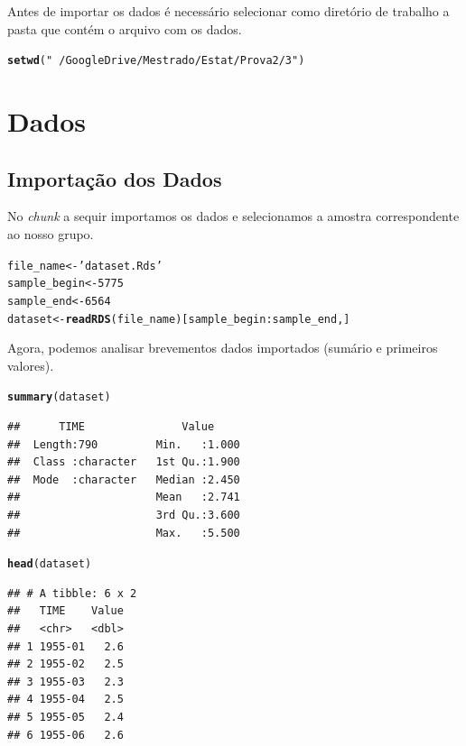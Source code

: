\documentclass{article}\usepackage[]{graphicx}\usepackage[]{color}
\makeatletter
\newcommand{\hlnum}[1]{\textcolor[rgb]{0.686,0.059,0.569}{#1}}%
\newcommand{\hlstr}[1]{\textcolor[rgb]{0.192,0.494,0.8}{#1}}%
\newcommand{\hlopt}[1]{\textcolor[rgb]{0,0,0}{#1}}%
\newcommand{\hlstd}[1]{\textcolor[rgb]{0.345,0.345,0.345}{#1}}%
\newcommand{\hlkwb}[1]{\textcolor[rgb]{0.69,0.353,0.396}{#1}}%
\newcommand{\hlkwd}[1]{\textcolor[rgb]{0.737,0.353,0.396}{\textbf{#1}}}%
\newenvironment{kframe}{%
 \def\at@end@of@kframe{}%
 \ifinner\ifhmode%
  \def\at@end@of@kframe{\end{minipage}}%
  \begin{minipage}{\columnwidth}%
 \fi\fi%
 \def\FrameCommand##1{\hskip\@totalleftmargin \hskip-\fboxsep
 \colorbox{shadecolor}{##1}\hskip-\fboxsep
     \hskip-\linewidth \hskip-\@totalleftmargin \hskip\columnwidth}%
 \MakeFramed {\advance\hsize-\width
   \@totalleftmargin\z@ \linewidth\hsize
   \@setminipage}}%
 {\par\unskip\endMakeFramed%
 \at@end@of@kframe}
\newenvironment{knitrout}{}{} %
\makeatother
\begin{document}
    Antes de importar os dados é necessário selecionar como diretório de trabalho a pasta que contém o arquivo com os dados.

\begin{knitrout}
\color{fgcolor}\begin{kframe}
\begin{alltt}
\hlkwd{setwd}\hlstd{(}\hlstr{"~/Google Drive/Mestrado/Estat/Prova2/3"}\hlstd{)}
\end{alltt}
\end{kframe}
\end{knitrout}


\section{Dados}

\subsection{Importação dos Dados}

No \textit{chunk} a sequir importamos os dados e selecionamos a amostra correspondente ao nosso grupo.

\begin{knitrout}
\color{fgcolor}\begin{kframe}
\begin{alltt}
\hlstd{file_name}    \hlkwb{<-} \hlstr{'dataset.Rds'}
\hlstd{sample_begin} \hlkwb{<-} \hlnum{5775}
\hlstd{sample_end}   \hlkwb{<-} \hlnum{6564}
\hlstd{dataset}      \hlkwb{<-} \hlkwd{readRDS}\hlstd{(file_name)[sample_begin}\hlopt{:}\hlstd{sample_end,]}
\end{alltt}
\end{kframe}
\end{knitrout}
  
  Agora, podemos analisar brevementos dados importados (sumário e primeiros valores).

\begin{knitrout}
\color{fgcolor}\begin{kframe}
\begin{alltt}
\hlkwd{summary}\hlstd{(dataset)}
\end{alltt}
\begin{verbatim}
##      TIME               Value      
##  Length:790         Min.   :1.000  
##  Class :character   1st Qu.:1.900  
##  Mode  :character   Median :2.450  
##                     Mean   :2.741  
##                     3rd Qu.:3.600  
##                     Max.   :5.500
\end{verbatim}
\begin{alltt}
\hlkwd{head}\hlstd{(dataset)}
\end{alltt}
\begin{verbatim}
## # A tibble: 6 x 2
##   TIME    Value
##   <chr>   <dbl>
## 1 1955-01   2.6
## 2 1955-02   2.5
## 3 1955-03   2.3
## 4 1955-04   2.5
## 5 1955-05   2.4
## 6 1955-06   2.6
\end{verbatim}
\end{kframe}
\end{knitrout}
  
\end{document}
